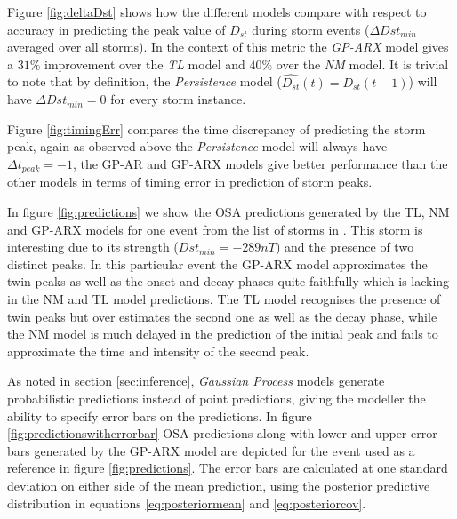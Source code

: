 \documentclass[referee,a4paper,12pt,traditabstract]{swsc}
\begin{document}
\begin{linenumbers}
Figure \ref{fig:deltaDst} shows how the different models compare with respect to accuracy in predicting the peak value of $D_{st}$ during storm events ($\Delta Dst_{min}$ averaged over all storms). In the context of this metric the \emph{GP-ARX} model gives a $31\%$ improvement over the \emph{TL} model and $40\%$ over the \emph{NM} model. It is trivial to note that by definition, the \emph{Persistence} model ($\hat{D_{st}}(t) = D_{st}(t-1)$) will have $\Delta Dst_{min} = 0$ for every storm instance.

Figure \ref{fig:timingErr} compares the time discrepancy of predicting the storm peak, again as observed above the \emph{Persistence} model will always have $\Delta t_{peak} = -1$, the GP-AR and GP-ARX models give better performance than the other models in terms of timing error in prediction of storm peaks. 

In figure \ref{fig:predictions} we show the OSA predictions generated by the TL, NM and GP-ARX models for one event from the list of storms in \citet{Ji2012}. This storm is interesting due to its strength ($Dst_{min} = -289 nT$) and the presence of two distinct peaks. In this particular event the GP-ARX model approximates the twin peaks as well as the onset and decay phases quite faithfully which is lacking in the NM and TL model predictions. The TL model recognises the presence of twin peaks but over estimates the second one as well as the decay phase, while the NM model is much delayed in the prediction of the initial peak and fails to approximate the time and intensity of the second peak.

As noted in section \ref{sec:inference}, \emph{Gaussian Process} models generate probabilistic predictions instead of point predictions, giving the modeller the ability to specify error bars on the predictions. In figure \ref{fig:predictionswitherrorbar} OSA predictions along with lower and upper error bars generated by the GP-ARX model are depicted for the event used as a reference in figure \ref{fig:predictions}. The error bars are calculated at one standard deviation on either side of the mean prediction, using the posterior predictive distribution in equations \ref{eq:posteriormean} and \ref{eq:posteriorcov}.


\end{linenumbers}
\end{document}
